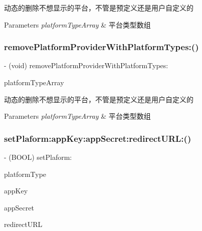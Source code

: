 动态的删除不想显示的平台，不管是预定义还是用户自定义的


\begin{DoxyParams}{Parameters}
{\em platform\+Type\+Array} & 平台类型数组 \\
\hline
\end{DoxyParams}
\mbox{\label{interface_u_m_social_manager_a819b388a668c5ab8e5674d3ff2e9f338}} 
\subsubsection{\texorpdfstring{remove\+Platform\+Provider\+With\+Platform\+Types\+:()}{removePlatformProviderWithPlatformTypes:()}\hspace{0.1cm}{\footnotesize\ttfamily [2/2]}}
{\footnotesize\ttfamily -\/ (void) remove\+Platform\+Provider\+With\+Platform\+Types\+: \begin{DoxyParamCaption}\item[{(N\+S\+Array $\ast$)}]{platform\+Type\+Array }\end{DoxyParamCaption}}

动态的删除不想显示的平台，不管是预定义还是用户自定义的


\begin{DoxyParams}{Parameters}
{\em platform\+Type\+Array} & 平台类型数组 \\
\hline
\end{DoxyParams}
\mbox{\label{interface_u_m_social_manager_a8214a4f6d823590b7f632f5a615732ed}} 
\subsubsection{\texorpdfstring{set\+Plaform\+:app\+Key\+:app\+Secret\+:redirect\+U\+R\+L\+:()}{setPlaform:appKey:appSecret:redirectURL:()}\hspace{0.1cm}{\footnotesize\ttfamily [1/2]}}
{\footnotesize\ttfamily -\/ (B\+O\+OL) set\+Plaform\+: \begin{DoxyParamCaption}\item[{(U\+M\+Social\+Platform\+Type)}]{platform\+Type }\item[{appKey:(N\+S\+String $\ast$)}]{app\+Key }\item[{appSecret:(N\+S\+String $\ast$)}]{app\+Secret }\item[{redirectURL:(N\+S\+String $\ast$)}]{redirect\+U\+RL }\end{DoxyParamCaption}}

